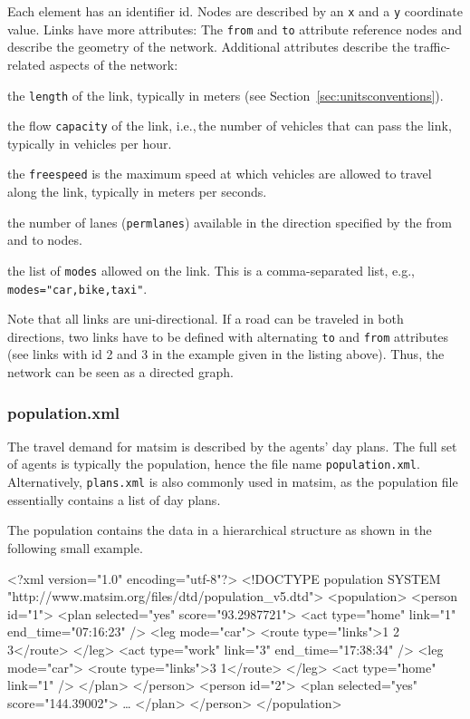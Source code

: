 Each element has an identifier id. Nodes are described by an \lstinline|x| and a \lstinline|y| coordinate value. Links have more attributes: The \lstinline|from| and \lstinline|to| attribute reference nodes and describe the geometry of the network. Additional attributes describe the traffic-related aspects of the network:
\begin{compactitem}
    \item the \lstinline|length| of the link, typically in meters (see Section~\ref{sec:unitsconventions}).
    \item the flow \lstinline|capacity| of the link, i.e.,\,the number of vehicles that can pass the link, typically in vehicles per hour.
    \item the \lstinline|freespeed| is the maximum speed at which vehicles are allowed to travel along the link, typically in meters per seconds.
    \item the number of lanes (\lstinline|permlanes|) available in the direction specified by the from and to nodes.
    \item the list of \lstinline|modes| allowed on the link. This is a comma-separated list, e.g.,\,\lstinline|modes="car,bike,taxi"|.
\end{compactitem}
Note that all links are uni-directional. If a road can be traveled in both directions, two links have to be defined with alternating \lstinline|to| and \lstinline|from| attributes (see links with id 2 and 3 in the example given in the listing above). Thus, the network can be seen as a directed graph. 

\subsubsection{population.xml}
The travel demand for \gls{matsim} is described by the agents' day plans. The full set of agents is typically the population, hence the file name \lstinline|population.xml|. Alternatively, \lstinline|plans.xml| is also commonly used in \gls{matsim}, as the population file essentially contains a list of day plans.

The population contains the data in a hierarchical structure as shown in the following small example.

\begin{xml}
<?xml version="1.0" encoding="utf-8"?> 
<!DOCTYPE population SYSTEM "http://www.matsim.org/files/dtd/population_v5.dtd"> 
<population> 
   <person id="1"> 
      <plan selected="yes" score="93.2987721"> 
         <act type="home" link="1" end_time="07:16:23" /> 
         <leg mode="car"> 
            <route type="links">1 2 3</route> 
         </leg> 
         <act type="work" link="3" end_time="17:38:34" /> 
         <leg mode="car"> 
            <route type="links">3 1</route> 
         </leg> 
         <act type="home" link="1" /> 
      </plan> 
   </person> 
   <person id="2"> 
      <plan selected="yes" score="144.39002"> 
         \ldots 
      </plan> 
   </person> 
</population>
\end{xml}

